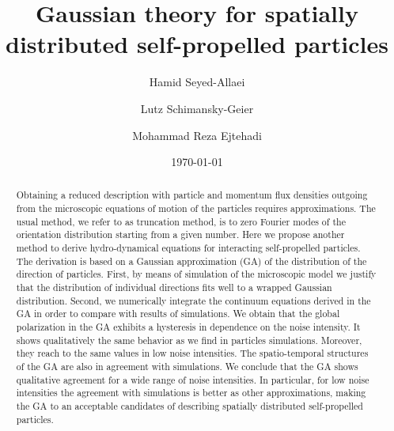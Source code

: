 \documentclass[reprint,floatfix,amsmath,amssymb,aps,pre,showkeys,showpacs,superscriptaddress]{revtex4-1}
\newcommand{\hl}[1]{\textcolor{hlcolor}{#1}}
\begin{document}
\title{Gaussian theory for spatially distributed self-propelled particles}

\date{\today}

\author{Hamid Seyed-Allaei}
\author{Lutz Schimansky-Geier}
\author{Mohammad Reza Ejtehadi}

\begin{abstract}
Obtaining a \hl{reduced description with particle and momentum flux densities outgoing from the microscopic equations of motion of the particles} requires approximations. The usual method, we refer to as truncation method, is to zero Fourier modes of the orientation distribution starting from a given number. Here we propose another method to derive hydro-dynamical equations for interacting self-propelled particles. The derivation is based on a Gaussian approximation (GA) of the distribution of the direction of particles. First, by means of simulation of the microscopic model we justify that the distribution of individual directions fits well to a wrapped Gaussian distribution. Second, we numerically integrate the continuum equations derived in the GA in order to compare with results of simulations. We obtain that the global polarization in the GA exhibits a hysteresis in dependence on the noise intensity. It shows qualitatively the same behavior as we find  in particles simulations. Moreover, they reach to the same values in low noise intensities. The spatio-temporal structures of the GA are also in agreement with simulations. We conclude that the GA shows qualitative agreement  for a wide range of noise
intensities\hl{. In particular, for low noise intensities the agreement with  simulations is better as other approximations, making  the GA} to an acceptable candidates of describing spatially distributed self-propelled particles.
\end{abstract}


\maketitle
\end{document}
